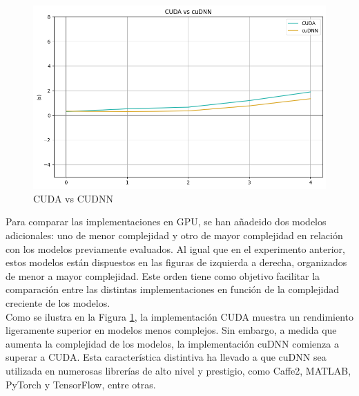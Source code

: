 \begin{figure}[H]
	\centering
	\includegraphics[scale=0.52]{imagenes/cuda_cudnn_1.png}  
	\caption{CUDA vs CUDNN}
	\label{fig:cuda_cudnn_1}
\end{figure}

Para comparar las implementaciones en GPU, se han añadeido dos modelos adicionales: uno de menor complejidad y otro de mayor complejidad en relación con los modelos previamente evaluados. Al igual que en el experimento anterior, estos modelos están dispuestos en las figuras de izquierda a derecha, organizados de menor a mayor complejidad. Este orden tiene como objetivo facilitar la comparación entre las distintas implementaciones en función de la complejidad creciente de los modelos. \\
Como se ilustra en la Figura \ref{fig:cuda_cudnn_1}, la implementación CUDA muestra un rendimiento ligeramente superior en modelos menos complejos. Sin embargo, a medida que aumenta la complejidad de los modelos, la implementación cuDNN comienza a superar a CUDA. Esta característica distintiva ha llevado a que cuDNN sea utilizada en numerosas librerías de alto nivel y prestigio, como Caffe2, MATLAB, PyTorch y TensorFlow, entre otras. 

